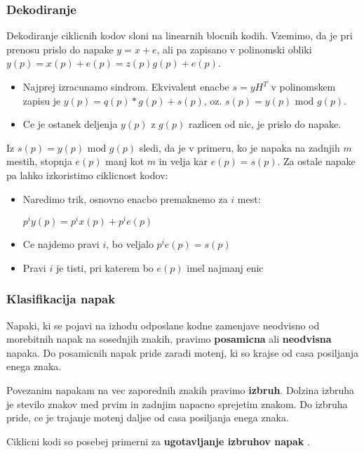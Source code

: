 \documentclass{article}
\begin{document}
\begin{multicols}{3}
\subsubsection{Dekodiranje}
Dekodiranje ciklicnih kodov sloni na linearnih blocnih kodih. Vzemimo, da je pri prenosu prislo do napake $y = x + e$, ali pa zapisano v polinomski
obliki $y(p) = x(p) + e(p) = z(p)g(p) + e(p)$.
\begin{itemize}
    \item Najprej izracunamo sindrom. Ekvivalent enacbe $s = yH^T$ v polinomskem zapisu je $y(p) = q(p)*g(p) + s(p)$, oz. $s(p) = y(p) \text{ mod } g(p)$.
    \item Ce je ostanek deljenja $y(p)$ z $g(p)$ razlicen od nic, je prislo do napake.
\end{itemize}
Iz $s(p) = y(p) \text{ mod } g(p)$ sledi, da je v primeru, ko je napaka na zadnjih $m$ mestih, stopnja $e(p)$ manj kot $m$ in velja kar $e(p) = s(p)$.
Za ostale napake pa lahko izkoristimo ciklicnost kodov:
\begin{itemize}
    \item Naredimo trik, osnovno enacbo premaknemo za $i$ mest:
        \begin{center}
            $p^iy(p) = p^ix(p) + p^i e(p)$
        \end{center}
    \item Ce najdemo pravi $i$, bo veljalo $p^i e(p) = s(p)$
    \item Pravi $i$ je tisti, pri katerem bo $e(p)$ imel najmanj enic
\end{itemize}

\subsubsection{Klasifikacija napak}
Napaki, ki se pojavi na izhodu odposlane kodne zamenjave neodvisno od morebitnih napak
na sosednjih znakih, pravimo \textbf{posamicna} ali \textbf{neodvisna} napaka. Do posamicnih 
napak pride zaradi motenj, ki so krajse od casa posiljanja enega znaka.

Povezanim napakam na vec zaporednih znakih pravimo \textbf{izbruh}. Dolzina izbruha je stevilo znakov med
prvim in zadnjim napacno sprejetim znakom. Do izbruha pride, ce je trajanje motenj daljse od casa posiljanja enega znaka.

Ciklicni kodi so posebej primerni za \textbf{ ugotavljanje izbruhov napak }.


\end{multicols}
\end{document}
